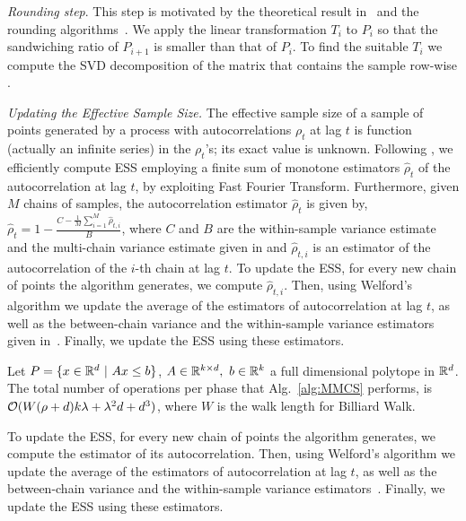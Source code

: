    \emph{Rounding step}. This step is
   motivated by the theoretical result in~\cite{Adamczak10} and the rounding
   algorithms~\cite{Lovasz06, Cousins15}.
   We apply the linear transformation $T_i$ to $P_i$
   so that the sandwiching ratio of $P_{i+1}$ is smaller than that of $P_i$.
   To find the suitable $T_i$ we compute  the SVD decomposition of the matrix that contains the sample row-wise \cite{Shiri20}.
   
   \emph{Updating the  Effective Sample Size.}
   The effective sample size of a sample of points generated by a process with autocorrelations $\rho_t$ at lag $t$
   is function (actually an infinite series) in the $\rho_t$'s; its exact value is unknown.
   Following \cite{geyer92}, we efficiently compute ESS employing a finite sum of monotone estimators
   $\hat{\rho}_t$ of the autocorrelation at lag $t$, by exploiting Fast Fourier Transform. 
   Furthermore, given $M$ chains of samples, the autocorrelation estimator $\hat{\rho}_t$ is given by,
   $\hat{\rho}_t = 1 - \frac{C - \frac{1}{M}\sum_{i=1}^{M}\hat{\rho}_{t,i}}{B}$, 
   where $C$ and $B$ are the within-sample variance estimate and the multi-chain variance estimate given in \cite{Gelman92} and $\hat{\rho}_{t,i}$ is an estimator of the autocorrelation of the $i$-th chain at lag $t$.
   To update the ESS, for every new chain of points the algorithm generates, we compute
   $\hat{\rho}_{t,i}$. Then, using Welford's algorithm we
   update the average of the estimators of autocorrelation at lag $t$,
   as well as the between-chain variance and the within-sample variance estimators given in~\cite{Gelman92}.
   Finally, we update the ESS using these estimators.
   
   
   \begin{lem}\label{lem:mmcs_complexity}
   Let $P=\{x\in{\mathbb R}^d\ |\ Ax\leq b\}$, $A\in{\mathbb R}^{k\times d},\ b\in{\mathbb R}^k$ a full dimensional polytope in ${\mathbb R}^d$.
   The total number of operations per phase that Alg.~\ref{alg:MMCS} performs, is
   $\mathcal{O}(W(\rho + d)k\lambda + \lambda^2d + d^3)$,
   where $W$ is the walk length for Billiard Walk.
   \end{lem}
   

   To update the ESS, for every new chain of points the algorithm generates, we compute
   the estimator of its autocorrelation. Then, using Welford's algorithm we
   update the average of the estimators of autocorrelation at lag $t$,
   as well as the between-chain variance and the within-sample variance estimators~\cite{Gelman92}.
   Finally, we update the ESS using these estimators.
   
